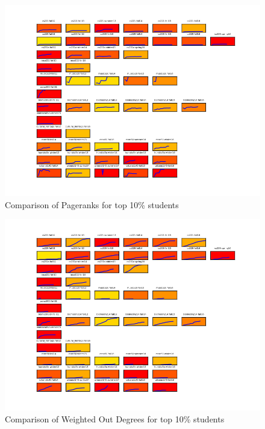\begin{figure}[htp]
       \centering
       \includegraphics[width=1\textwidth]{Figs/pagerank_sm_color.png}
       \caption{\textnormal{Comparison of Pageranks for top 10\% students}}
       \label{fig:pageRankCompare}
\end{figure}

\begin{figure}[htp]
       \centering
       \includegraphics[width=1\textwidth]{Figs/weighted_out_degree_sm_color.png}
       \caption{\textnormal{Comparison of Weighted Out Degrees for top 10\% students}}
       \label{fig:outDegCompare}
\end{figure}

